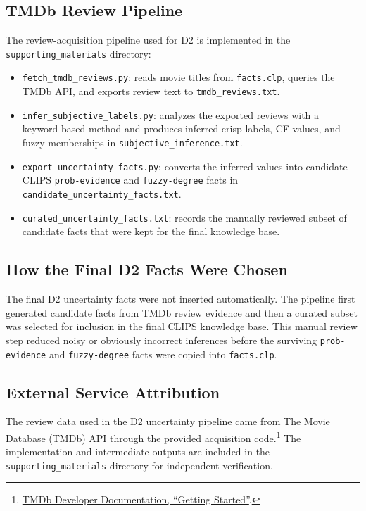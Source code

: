 \documentclass[11pt]{article}
\begin{document}
\subsection{TMDb Review Pipeline}
The review-acquisition pipeline used for D2 is implemented in the \texttt{supporting\_materials} directory:
\begin{itemize}
  \item \texttt{fetch\_tmdb\_reviews.py}: reads movie titles from \texttt{facts.clp}, queries the TMDb API, and exports review text to \texttt{tmdb\_reviews.txt}.
  \item \texttt{infer\_subjective\_labels.py}: analyzes the exported reviews with a keyword-based method and produces inferred crisp labels, CF values, and fuzzy memberships in \texttt{subjective\_inference.txt}.
  \item \texttt{export\_uncertainty\_facts.py}: converts the inferred values into candidate CLIPS \texttt{prob-evidence} and \texttt{fuzzy-degree} facts in \texttt{candidate\_uncertainty\_facts.txt}.
  \item \texttt{curated\_uncertainty\_facts.txt}: records the manually reviewed subset of candidate facts that were kept for the final knowledge base.
\end{itemize}

\subsection{How the Final D2 Facts Were Chosen}
The final D2 uncertainty facts were not inserted automatically. The pipeline first generated candidate facts from TMDb review evidence and then a curated subset was selected for inclusion in the final CLIPS knowledge base. This manual review step reduced noisy or obviously incorrect inferences before the surviving \texttt{prob-evidence} and \texttt{fuzzy-degree} facts were copied into \texttt{facts.clp}.

\subsection{External Service Attribution}
The review data used in the D2 uncertainty pipeline came from The Movie Database (TMDb) API through the provided acquisition code.\footnote{\href{https://developer.themoviedb.org/docs/getting-started}{TMDb Developer Documentation, ``Getting Started''}.} The implementation and intermediate outputs are included in the \texttt{supporting\_materials} directory for independent verification.
\end{document}
